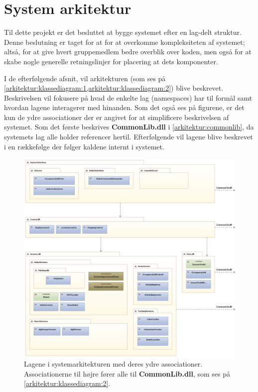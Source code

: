 \section{System arkitektur}\label{arkitektur}
Til dette projekt er det besluttet at bygge systemet efter en lag-delt struktur.
Denne beslutning er taget for at for at overkomme kompleksiteten af systemet; altså, for at give hvert gruppemedlem bedre overblik over koden, men også for at skabe nogle generelle retningslinjer for placering at dets komponenter.

I de efterfølgende afsnit, vil arkitekturen (som ses på  \cref{arkitektur:klassediagram:1,arkitektur:klassediagram:2}) blive beskrevet.
Beskrivelsen vil fokusere på hvad de enkelte lag (namespaces) har til formål samt hvordan lagene interagerer med hinanden.
Som det også ses på figurene, er det kun de ydre associationer der er angivet for at simplificere beskrivelsen af systemet.
Som det første beskrives \textbf{CommonLib.dll} i \cref{arkitektur:commonlib}, da systemets lag alle holder referencer hertil.
Efterfølgende vil lagene blive beskrevet i en rækkefølge der følger kaldene internt i systemet.

\begin{figure}
\centering
\includegraphics[width=1\textwidth]{./graphics/systemarkitektur_1}
\caption{Lagene i systemarkitekturen med deres ydre associationer. Associationerne til højre fører alle til \textbf{CommonLib.dll}, som ses på \cref{arkitektur:klassediagram:2}.}
\label{arkitektur:klassediagram:1}
\end{figure}

